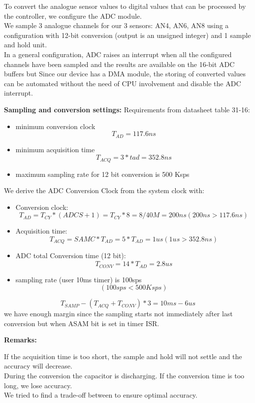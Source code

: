 To convert the analogue sensor values to digital values that can be processed by the controller, we configure the ADC module. \\
We sample 3 analogue channels for our 3 sensors: AN4, AN6, AN8 using a configuration with 12-bit conversion (output is an unsigned integer) and 1 sample and hold unit.\\
In a general configuration, ADC raises an interrupt when all the configured channels have been sampled and the results are available on the 16-bit ADC buffers but Since our device has a DMA module, the storing of converted values can be automated without the need of CPU involvement and disable the ADC interrupt.

\textbf{Sampling and conversion settings:}
Requirements from datasheet table 31-16: 
\begin{itemize}
    \item minimum conversion clock $$T_{AD} = 117.6 ns$$
    \item minimum acquisition time $$T_{ACQ}=3*tad= 352.8ns $$
    \item maximum sampling rate for 12 bit conversion is 500 Ksps
\end{itemize}

We derive the ADC Conversion Clock from the system clock with:
\begin{itemize}
    \item Conversion clock: $$T_{AD}=T_{CY}*(ADCS+1)= T_{CY}*8 = 8/40M= 200ns (200ns>117.6ns)$$
    \item Acquisition time:$$ T_{ACQ}= SAMC*T_{AD}= 5*T_{AD}=1us (1us>352.8ns)$$
    \item ADC total Conversion time (12 bit): $$T_{CONV}=14*T_{AD}=2.8us$$
    \item sampling rate (user 10ms timer) is 100sps $$(100sps < 500Ksps)$$
\end{itemize}
$$T_{SAMP}-(T_{ACQ}+T_{CONV})*3=10ms-6us$$ 
we have enough margin since the sampling starts not immediately after last conversion but when ASAM bit is set in timer ISR.

\textbf{Remarks:}

If the acquisition time is too short, the sample and hold will not settle and the accuracy will decrease.\\
During the conversion the capacitor is discharging. If the conversion time is too long, we lose accuracy. \\
We tried to find a trade-off between to ensure optimal accuracy.

